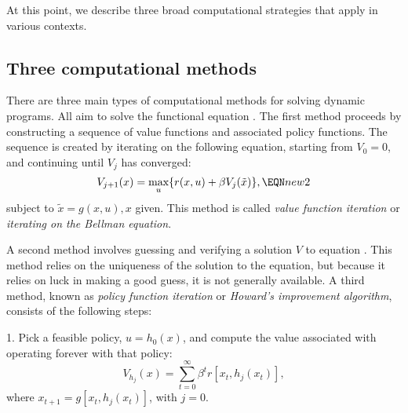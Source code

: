 \medskip


At this point, we describe three broad computational
strategies that apply in various contexts.

\subsection{Three computational methods}

There are three main  types of
computational methods for solving dynamic programs.
All aim to solve the functional equation
.
\medskip
{}
 The first method proceeds by constructing
a sequence of value functions and associated policy
functions.  The sequence is created by iterating on the following
equation, starting from $V_0=0$, and continuing until $V_j$ has
converged:
$$V_{j+1}(x) =\max_u \{r(x,u)+\be V_j(\tilde x)\},\EQN new2$$
subject to $\tilde x=g(x,u), x$ given.
This method is called {\it value function iteration\/} or
{\it iterating on the Bellman equation}.

\medskip
{} 
 A second method involves guessing and verifying a solution $V$
to equation .  This method relies on the uniqueness
of the solution to the equation, but because it relies on luck
in making a good guess, it is not generally available.
\medskip
{}
%
A third method, known as {\it policy function iteration} or {\it Howard's
improvement algorithm},
consists of the following steps:
\medskip
\item{1.} Pick a feasible policy, $u = h_0(x)$, and compute
the value associated with operating forever with that policy:
$$ V_{h_j}(x) = \sum_{t=0}^\infty \beta^t r[x_t, h_j(x_t)]  ,$$
where $x_{t+1} = g[x_t, h_j(x_t)]$, with $j=0$.

